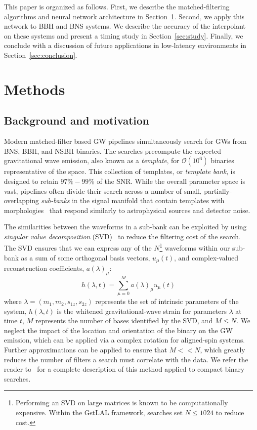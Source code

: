 \documentclass[twocolumn,prd,superscriptaddress,nofootinbib]{revtex4-1}
\begin{document}
This paper is organized as follows. First, we describe the matched-filtering
algorithms and neural network architecture in Section~\ref{sec:methods}.
Second, we apply this network to BBH and BNS 
systems. We describe the accuracy of the interpolant on these systems and present a timing study in Section~\ref{sec:study}. Finally, we conclude with a discussion of
future applications in low-latency environments in Section~\ref{sec:conclusion}.

\section{Methods}
\label{sec:methods}
\subsection{Background and motivation}

Modern matched-filter based GW pipelines simultaneously search for GWs from
BNS, BBH, and NSBH binaries. The searches precompute
the expected gravitational wave emission, also known as a \emph{template}, 
for $\mathcal{O}(10^6)$ binaries representative of the space. This collection
of templates, or \emph{template bank}, is designed to retain $97\%-99\%$ of the
SNR. While the overall parameter space is
vast, pipelines often divide their search across a number of
small, partially-overlapping \emph{sub-banks} in the signal manifold that contain
templates with morphologies~\cite{Messick:2016aqy,Roulet:2019hzy,Sakon:2022ibh}
that respond similarly to astrophysical sources and detector noise.

The similarities between the waveforms in a sub-bank can be exploited by using
\emph{singular value decomposition} (SVD)~\cite{Cannon:2010qh,Roulet:2019hzy}
to reduce the
filtering cost of the search. The SVD ensures that we can express any of the
$N$\footnote{Performing an SVD on large matrices is known to be computationally
expensive. Within the GstLAL framework, searches set $ N \leq 1024 $ to reduce cost.} waveforms within
our sub-bank as a sum of some orthogonal basis vectors, $u_\mu(t)$, and
complex-valued reconstruction coefficients, $a(\lambda)_\mu$:
%
\begin{equation} h(\lambda, t) = \sum_{\mu=0}^{M} a(\lambda)_\mu u_\mu(t) \end{equation}
%
where $\lambda= (m_1, m_2, s_{1z}, s_{2z})$ represents the set of intrinsic parameters of the system, $h(\lambda,t)$ is the
whitened gravitational-wave strain for parameters $\lambda$ at time $t$, $M$ represents the number of bases identified by the SVD, and $M \leq N$.
We neglect the impact of the location and orientation of the binary on
the GW emission, which can be applied via a complex rotation for
aligned-spin systems. Further approximations can be applied to ensure that $M
<< N$, which greatly
reduces the number of filters a search must correlate with the data. We refer
the reader to~\cite{Cannon:2010qh} for a complete description of this method applied to compact binary searches.
\end{document}
